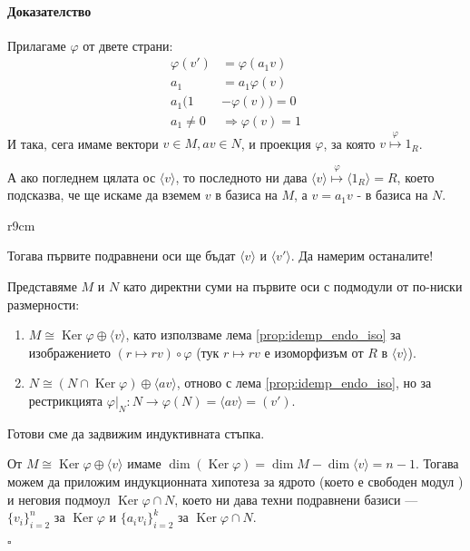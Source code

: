 \documentclass{article}
\newif\ifusemulticols
\newif\ifmobileview
\theoremstyle{definition}
\theoremstyle{remark}
\theoremstyle{plain}
\theoremstyle{plain}
\newenvironment{mymulticols}
    { \ifusemulticols \begin{multicols}{2} \fi }
    { \ifusemulticols \end{multicols} \fi }
\newcommand\mywrapbegin[3]{\ifmobileview\else\begin{wrapfigure}[#1]{#2}{#3}\fi}
\newcommand\mywrapend{\ifmobileview\else\end{wrapfigure}\fi}
\newenvironment{myproof}{\paragraph{Доказателство}}{\hfill$\square$}
\DeclareMathOperator{\Ker}{Ker}
\begin{document}
\begin{mymulticols}
\begin{myproof}
    Прилагаме $\varphi$ от двете страни:
    \begin{align*}
        \varphi(v') &= \varphi(a_1v)\\
        a_1 &= a_1 \varphi(v)\\
        a_1 ( 1 &- \varphi(v) ) = 0\\
        a_1 \neq 0 &\Rightarrow \varphi(v) = 1
    \end{align*}
    И така, сега имаме вектори $v \in M, av \in N$, и проекция $\varphi$, за която $v \overset{\varphi}\mapsto 1_R$.

    А ако погледнем цялата ос $\langle v\rangle$, то последното ни дава $\langle v\rangle \overset{\varphi} \mapsto \langle 1_R\rangle = R$, което  подсказва, че ще искаме да вземем
    $v$ в базиса на $M$, а $v=a_1v$ - в базиса на $N$.

    \mywrapbegin{21}{r}{9cm}
    \mywrapend

    Тогава първите подравнени оси ще бъдат $\langle v \rangle$ и $\langle v' \rangle$.
    Да намерим останалите!

    Представяме $M$ и $N$ като директни суми на първите оси с подмодули от по-ниски размерности:

    \begin{enumerate}
        \item $M \cong \Ker \varphi \oplus \langle v \rangle$, като използваме
            лема \ref{prop:idemp_endo_iso} за изображението $(r \mapsto rv) \circ \varphi$ 
            (тук $r\mapsto rv$ е изоморфизъм от $R$ в $\langle v \rangle$).

        \item $N \cong (N \cap \Ker \varphi) \oplus \langle av \rangle$, отново с лема \ref{prop:idemp_endo_iso},
          но за рестрикцията $\varphi|_N: N \to \varphi(N) = \langle av\rangle = \left(v'\right)$.
    \end{enumerate}

    Готови сме да задвижим индуктивната стъпка.

    От $M \cong \Ker \varphi \oplus \langle v \rangle$ имаме $\dim(\Ker \varphi) = \dim
    M-\dim \langle v \rangle = n - 1$. Тогава можем да приложим индукционната хипотеза за ядрото
    (което е свободен модул%
    ) и
    неговия подмоул $\Ker \varphi \cap N$, което ни дава техни подравнени базиси --- $\{ v_i
    \}_{i=2}^n$ за $\Ker \varphi$ и $\{ a_i v_i \}_{i=2}^k$ за $\Ker \varphi \cap N$.


\end{myproof}
\end{mymulticols}
\end{document}
